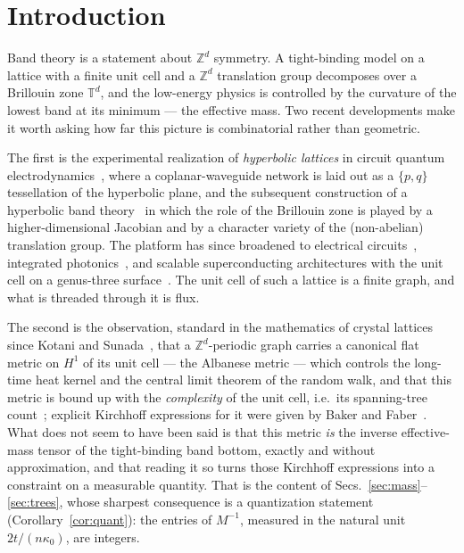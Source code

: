 \documentclass[aps,prb,reprint,amsmath,amssymb,floatfix,superscriptaddress]{revtex4-2}
\theoremstyle{plain}
\theoremstyle{definition}
\theoremstyle{remark}
\newcommand{\Z}{\mathbb{Z}}
\newcommand{\T}{\mathbb{T}}
\begin{document}
\section{Introduction}\label{sec:intro}

Band theory is a statement about $\Z^{d}$ symmetry. A tight-binding model on a lattice with
a finite unit cell and a $\Z^{d}$ translation group decomposes over a Brillouin zone
$\T^{d}$, and the low-energy physics is controlled by the curvature of the lowest band at
its minimum --- the effective mass. Two recent developments make it worth asking how far
this picture is combinatorial rather than geometric.

The first is the experimental realization of \emph{hyperbolic lattices} in circuit quantum
electrodynamics~\cite{KFH}, where a coplanar-waveguide network is laid out as a $\{p,q\}$
tessellation of the hyperbolic plane, and the subsequent construction of a hyperbolic band
theory~\cite{MR1,MR2} in which the role of the Brillouin zone is played by a
higher-dimensional Jacobian and by a character variety of the (non-abelian) translation
group. The platform has since broadened to electrical
circuits~\cite{Leng22}, integrated photonics~\cite{Huang24}, and scalable superconducting
architectures with the unit cell on a genus-three surface~\cite{Xu25}. The unit cell of such
a lattice is a finite graph, and what is threaded through it is flux.

The second is the observation, standard in the mathematics of crystal lattices since Kotani
and Sunada~\cite{KS1,KS2}, that a $\Z^{d}$-periodic graph carries a canonical flat metric
on $H^{1}$ of its unit cell --- the Albanese metric --- which controls the long-time heat
kernel and the central limit theorem of the random walk, and that this metric is bound up
with the \emph{complexity} of the unit cell, i.e.\ its spanning-tree count~\cite{KS3};
explicit Kirchhoff expressions for it were given by Baker and Faber~\cite{BF}. What does not
seem to have been said is that this metric \emph{is} the inverse effective-mass tensor of
the tight-binding band bottom, exactly and without approximation, and that reading it so
turns those Kirchhoff expressions into a constraint on a measurable quantity. That is the
content of Secs.~\ref{sec:mass}--\ref{sec:trees}, whose sharpest consequence is a
quantization statement (Corollary~\ref{cor:quant}): the entries of $M^{-1}$, measured in the
natural unit $2t/(n\kappa_0)$, are integers.
\end{document}
